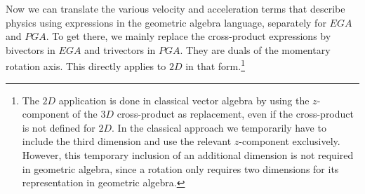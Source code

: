 Now we can translate the various velocity and acceleration terms that describe physics
using expressions in the geometric algebra language, separately for $EGA$ and $PGA$. To
get there, we mainly replace the cross-product expressions by bivectors in $EGA$ and
trivectors in $PGA$. They are duals of the momentary rotation axis. This directly applies
to $2D$ in that form.\footnote{The $2D$ application is done in classical vector algebra by
using the $z$-component of the $3D$ cross-product as replacement, even if the
cross-product is not defined for $2D$. In the classical approach we temporarily have to
include the third dimension and use the relevant $z$-component exclusively. However, this
temporary inclusion of an additional dimension is not required in geometric algebra, since
a rotation only requires two dimensions for its representation in geometric algebra.}

